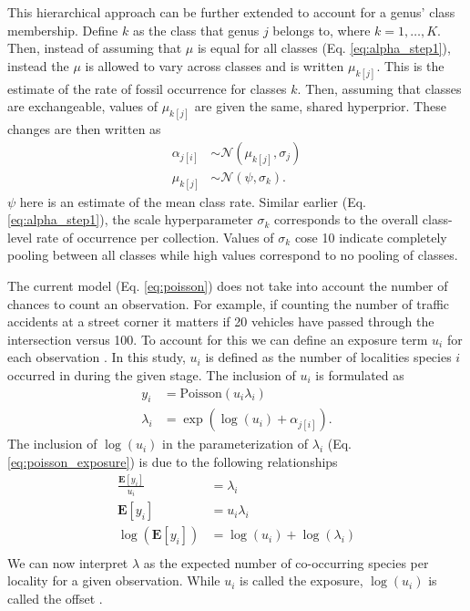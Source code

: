 \documentclass[12pt,letterpaper]{article}
\begin{document}
This hierarchical approach can be further extended to account for a genus' class membership. Define \(k\) as the class that genus \(j\) belongs to, where \(k = 1, \dots, K\). Then, instead of assuming that \(\mu\) is equal for all classes (Eq. \ref{eq:alpha_step1}), instead the \(\mu\) is allowed to vary across classes and is written \(\mu_{k[j]}\). This is the estimate of the rate of fossil occurrence for classes \(k\). Then, assuming that classes are exchangeable, values of \(\mu_{k[j]}\) are given the same, shared hyperprior. These changes are then written as
\begin{align}
  \alpha_{j[i]} &\sim \mathcal{N}(\mu_{k[j]}, \sigma_{j}) \nonumber \\
  \mu_{k[j]} &\sim \mathcal{N}(\psi, \sigma_{k}).
  \label{eq:alpha_step2}
\end{align}
\(\psi\) here is an estimate of the mean class rate. Similar earlier (Eq. \ref{eq:alpha_step1}), the scale hyperparameter \(\sigma_{k}\) corresponds to the overall class-level rate of occurrence per collection. Values of \(\sigma_{k}\) cose 10 indicate completely pooling between all classes while high values correspond to no pooling of classes.

The current model (Eq. \ref{eq:poisson}) does not take into account the number of chances to count an observation. For example, if counting the number of traffic accidents at a street corner it matters if 20 vehicles have passed through the intersection versus 100. To account for this we can define an exposure term \(u_{i}\) for each observation \citep{Gelman2007}. In this study, \(u_{i}\) is defined as the number of localities species \(i\) occurred in during the given stage. The inclusion of \(u_{i}\) is formulated as 
\begin{align}
  y_{i} &= \mathrm{Poisson}(u_{i}\lambda_{i}) \nonumber\\
  \lambda_{i} &= \exp(\log(u_{i}) + \alpha_{j[i]}).
  \label{eq:poisson_exposure}
\end{align}
The inclusion of \(\log(u_{i})\) in the parameterization of \(\lambda_{i}\) (Eq. \ref{eq:poisson_exposure}) is due to the following relationships 
\begin{align*}
  \frac{\mathbf{E}[y_i]}{u_{i}} &= \lambda_{i} \\
  \mathbf{E}[y_{i}] &= u_{i}\lambda_{i} \\
  \log(\mathbf{E}[y_{i}]) &= \log(u_{i}) + \log(\lambda_{i}) \\
\end{align*}
We can now interpret \(\lambda\) as the expected number of co-occurring species per locality for a given observation. While \(u_{i}\) is called the exposure, \(\log(u_{i})\) is called the offset \citep{Gelman2007}. 
\end{document}
